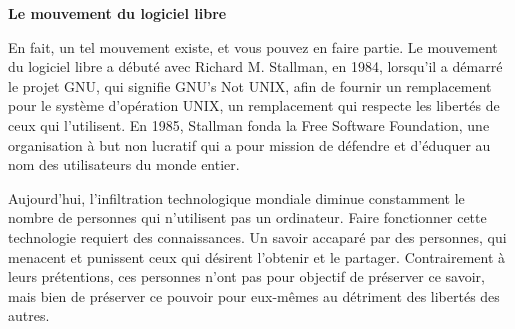 \documentclass[twoside,12pt]{article}
\begin{document}
\begin{center}
{\Large\bf Le mouvement du logiciel libre}
\end{center}

En fait, un tel mouvement existe, et vous pouvez en faire partie. Le mouvement
du logiciel libre a débuté avec Richard M. Stallman, en 1984, lorsqu'il a
démarré le projet GNU, qui signifie \guillemotleft GNU's Not
UNIX\guillemotright, afin de fournir un remplacement pour le système
d'opération UNIX, un remplacement qui respecte les libertés de ceux qui
l'utilisent. En 1985, Stallman fonda la Free Software Foundation, une
organisation à but non lucratif qui a pour mission de défendre et d'éduquer au
nom des utilisateurs du monde entier.


Aujourd'hui, l'infiltration technologique mondiale diminue constamment le
nombre de personnes qui n'utilisent pas un ordinateur. Faire fonctionner cette
technologie requiert des connaissances. Un savoir accaparé par des personnes,
qui menacent et punissent ceux qui désirent l'obtenir et le partager.
Contrairement à leurs prétentions, ces personnes n'ont pas pour objectif de
préserver ce savoir, mais bien de préserver ce pouvoir pour eux-mêmes au
détriment des libertés des autres.

\end{document}
